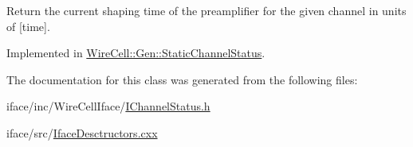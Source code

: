 Return the current shaping time of the preamplifier for the given channel in units of \mbox{[}time\mbox{]}. 

Implemented in \hyperlink{class_wire_cell_1_1_gen_1_1_static_channel_status_a8275297c1a7d034e3050827eaa8d6fb1}{Wire\+Cell\+::\+Gen\+::\+Static\+Channel\+Status}.



The documentation for this class was generated from the following files\+:\begin{DoxyCompactItemize}
\item 
iface/inc/\+Wire\+Cell\+Iface/\hyperlink{_i_channel_status_8h}{I\+Channel\+Status.\+h}\item 
iface/src/\hyperlink{_iface_desctructors_8cxx}{Iface\+Desctructors.\+cxx}\end{DoxyCompactItemize}

